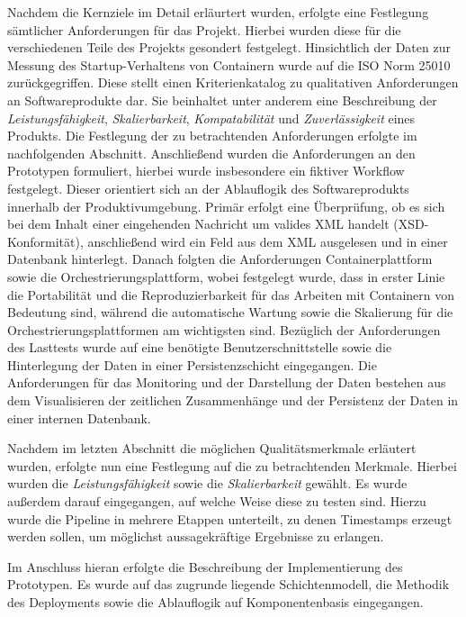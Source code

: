 Nachdem die Kernziele im Detail erläurtert wurden, erfolgte eine Festlegung sämtlicher Anforderungen für das Projekt. Hierbei wurden diese für die verschiedenen Teile des Projekts gesondert festgelegt. Hinsichtlich der Daten zur Messung des Startup-Verhaltens von Containern wurde auf die ISO Norm 25010 zurückgegriffen. Diese stellt einen Kriterienkatalog zu qualitativen Anforderungen an Softwareprodukte dar. Sie beinhaltet unter anderem eine Beschreibung der \emph{Leistungsfähigkeit}, \emph{Skalierbarkeit}, \emph{Kompatabilität} und \emph{Zuverlässigkeit} eines Produkts. Die Festlegung der zu betrachtenden Anforderungen erfolgte im nachfolgenden Abschnitt. Anschließend wurden die Anforderungen an den Prototypen formuliert, hierbei wurde insbesondere ein fiktiver Workflow festgelegt. Dieser orientiert sich an der Ablauflogik des Softwareprodukts innerhalb der Produktivumgebung. Primär erfolgt eine Überprüfung, ob es sich bei dem Inhalt einer eingehenden Nachricht um valides XML handelt (XSD-Konformität), anschließend wird ein Feld aus dem XML ausgelesen und in einer Datenbank hinterlegt. Danach folgten die Anforderungen Containerplattform sowie die Orchestrierungsplattform, wobei festgelegt wurde, dass in erster Linie die Portabilität und die Reproduzierbarkeit für das Arbeiten mit Containern von Bedeutung sind, während die automatische Wartung sowie die Skalierung für die Orchestrierungsplattformen am wichtigsten sind. Bezüglich der Anforderungen des Lasttests wurde auf eine benötigte Benutzerschnittstelle sowie die Hinterlegung der Daten in einer Persistenzschicht eingegangen. Die Anforderungen für das Monitoring und der Darstellung der Daten bestehen aus dem Visualisieren der zeitlichen Zusammenhänge und der Persistenz der Daten in einer internen Datenbank.

Nachdem im letzten Abschnitt die möglichen Qualitätsmerkmale erläutert wurden, erfolgte nun eine Festlegung auf die zu betrachtenden Merkmale. Hierbei wurden die \emph{Leistungsfähigkeit} sowie die \emph{Skalierbarkeit} gewählt. Es wurde außerdem darauf eingegangen, auf welche Weise diese zu testen sind. Hierzu wurde die Pipeline in mehrere Etappen unterteilt, zu denen Timestamps erzeugt werden sollen, um möglichst aussagekräftige Ergebnisse zu erlangen. 

Im Anschluss hieran erfolgte die Beschreibung der Implementierung des Prototypen. Es wurde auf das zugrunde liegende Schichtenmodell, die Methodik des Deployments sowie die Ablauflogik auf Komponentenbasis eingegangen. 

